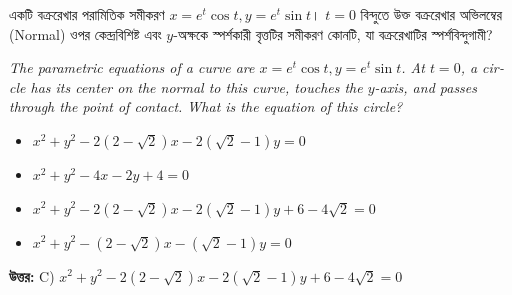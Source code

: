 \documentclass[12pt, a4paper]{article}
\begin{document}
\begin{tcolorbox}[questionbox={প্রশ্ন (Question) 44}]
    \noindent
    একটি বক্ররেখার পরামিতিক সমীকরণ $x = e^t \cos t, y = e^t \sin t$। $t = 0$ বিন্দুতে উক্ত বক্ররেখার অভিলম্বের (Normal) ওপর কেন্দ্রবিশিষ্ট এবং $y$-অক্ষকে স্পর্শকারী বৃত্তটির সমীকরণ কোনটি, যা বক্ররেখাটির স্পর্শবিন্দুগামী?
    
    \vspace{0.8em}
    \begin{english}
    \noindent\textit{\color{darkgray}
    The parametric equations of a curve are $x = e^t \cos t, y = e^t \sin t$. At $t=0$, a circle has its center on the normal to this curve, touches the $y$-axis, and passes through the point of contact. What is the equation of this circle?
    }
    \end{english}
\end{tcolorbox}

\begin{itemize}[label={}, leftmargin=1cm, itemsep=0.5em]
    \item[\textbf{A)}] $x^2 + y^2 - 2(2-\sqrt{2})x - 2(\sqrt{2}-1)y = 0$
    \item[\textbf{B)}] $x^2 + y^2 - 4x - 2y + 4 = 0$
    \item[\textbf{C)}] $x^2 + y^2 - 2(2-\sqrt{2})x - 2(\sqrt{2}-1)y + 6 - 4\sqrt{2} = 0$
    \item[\textbf{D)}] $x^2 + y^2 - (2-\sqrt{2})x - (\sqrt{2}-1)y = 0$
\end{itemize}

\vspace{0.5em}
\begin{tcolorbox}[answerbox]
    \textbf{\color{success} উত্তর:} C) $x^2 + y^2 - 2(2-\sqrt{2})x - 2(\sqrt{2}-1)y + 6 - 4\sqrt{2} = 0$
\end{tcolorbox}
\vspace{1em}
\end{document}

